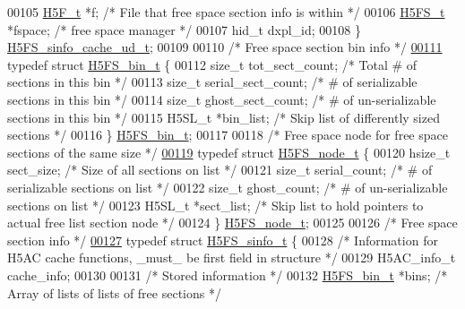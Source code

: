 \begin{DoxyCode}
00105     \hyperlink{struct_h5_f__t}{H5F\_t} *f;                  \textcolor{comment}{/* File that free space section info is within */}
00106     \hyperlink{struct_h5_f_s__t}{H5FS\_t} *fspace;            \textcolor{comment}{/* free space manager */}
00107     hid\_t dxpl\_id;
00108 \} \hyperlink{struct_h5_f_s__sinfo__cache__ud__t}{H5FS\_sinfo\_cache\_ud\_t};
00109 
00110 \textcolor{comment}{/* Free space section bin info */}
\hyperlink{struct_h5_f_s__bin__t}{00111} \textcolor{keyword}{typedef} \textcolor{keyword}{struct }\hyperlink{struct_h5_f_s__bin__t}{H5FS\_bin\_t} \{
00112     \textcolor{keywordtype}{size\_t} tot\_sect\_count;      \textcolor{comment}{/* Total # of sections in this bin */}
00113     \textcolor{keywordtype}{size\_t} serial\_sect\_count;   \textcolor{comment}{/* # of serializable sections in this bin */}
00114     \textcolor{keywordtype}{size\_t} ghost\_sect\_count;    \textcolor{comment}{/* # of un-serializable sections in this bin */}
00115     H5SL\_t *bin\_list;           \textcolor{comment}{/* Skip list of differently sized sections */}
00116 \} \hyperlink{struct_h5_f_s__bin__t}{H5FS\_bin\_t};
00117 
00118 \textcolor{comment}{/* Free space node for free space sections of the same size */}
\hyperlink{struct_h5_f_s__node__t}{00119} \textcolor{keyword}{typedef} \textcolor{keyword}{struct }\hyperlink{struct_h5_f_s__node__t}{H5FS\_node\_t} \{
00120     hsize\_t sect\_size;          \textcolor{comment}{/* Size of all sections on list */}
00121     \textcolor{keywordtype}{size\_t} serial\_count;        \textcolor{comment}{/* # of serializable sections on list */}
00122     \textcolor{keywordtype}{size\_t} ghost\_count;         \textcolor{comment}{/* # of un-serializable sections on list */}
00123     H5SL\_t *sect\_list;          \textcolor{comment}{/* Skip list to hold pointers to actual free list section node */}
00124 \} \hyperlink{struct_h5_f_s__node__t}{H5FS\_node\_t};
00125 
00126 \textcolor{comment}{/* Free space section info */}
\hyperlink{struct_h5_f_s__sinfo__t}{00127} \textcolor{keyword}{typedef} \textcolor{keyword}{struct }\hyperlink{struct_h5_f_s__sinfo__t}{H5FS\_sinfo\_t} \{
00128     \textcolor{comment}{/* Information for H5AC cache functions, \_must\_ be first field in structure */}
00129     H5AC\_info\_t cache\_info;
00130 
00131 \textcolor{comment}{/* Stored information */}
00132     \hyperlink{struct_h5_f_s__bin__t}{H5FS\_bin\_t} *bins;           \textcolor{comment}{/* Array of lists of lists of free sections   */}

\end{DoxyCode}
